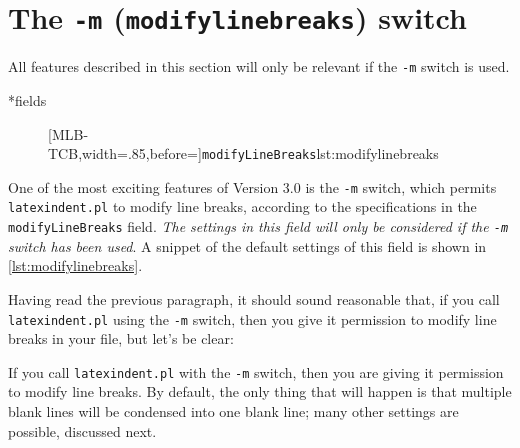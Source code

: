 
\section{The \texttt{-m} (\texttt{modifylinebreaks}) switch}\label{sec:modifylinebreaks}
 All features described in this section will only be relevant if the \texttt{-m} switch
 is used.

*{fields}
	\begin{figure}
		[MLB-TCB,width=.85\linewidth,before=\centering]{\texttt{modifyLineBreaks}}{lst:modifylinebreaks}
	\end{figure}
	One of the most exciting features of Version 3.0 is the \texttt{-m} switch, which
	permits \texttt{latexindent.pl} to modify line breaks, according to the
	specifications in the \texttt{modifyLineBreaks} field. \emph{The settings
		in this field will only be considered if the \texttt{-m} switch has been used}.
	A snippet of the default settings of this field is shown in \cref{lst:modifylinebreaks}.

	Having read the previous paragraph, it should sound reasonable that, if you call \texttt{latexindent.pl}
	using the \texttt{-m} switch, then you give it permission to modify line breaks in your file,
	but let's be clear:

	\begin{warning}
		If you call \texttt{latexindent.pl} with the \texttt{-m} switch, then you
		are giving it permission to modify line breaks. By default, the only
		thing that will happen is that multiple blank lines will be condensed into
		one blank line; many other settings are possible, discussed next.
	\end{warning}

